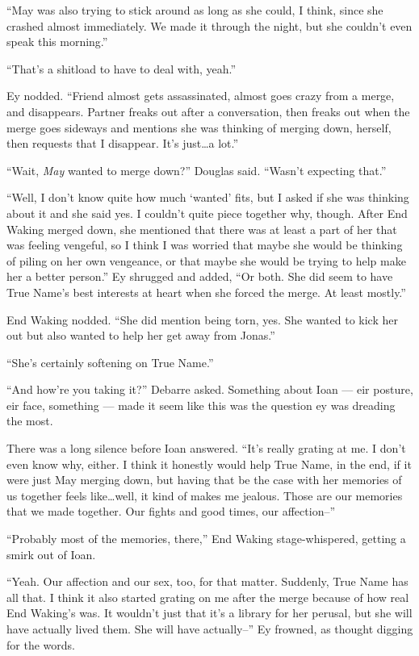 ``May was also trying to stick around as long as she could, I think, since she crashed almost immediately. We made it through the night, but she couldn't even speak this morning.''

``That's a shitload to have to deal with, yeah.''

Ey nodded. ``Friend almost gets assassinated, almost goes crazy from a merge, and disappears. Partner freaks out after a conversation, then freaks out when the merge goes sideways and mentions she was thinking of merging down, herself, then requests that I disappear. It's just\ldots a lot.''

``Wait, \emph{May} wanted to merge down?'' Douglas said. ``Wasn't expecting that.''

``Well, I don't know quite how much `wanted' fits, but I asked if she was thinking about it and she said yes. I couldn't quite piece together why, though. After End Waking merged down, she mentioned that there was at least a part of her that was feeling vengeful, so I think I was worried that maybe she would be thinking of piling on her own vengeance, or that maybe she would be trying to help make her a better person.'' Ey shrugged and added, ``Or both. She did seem to have True Name's best interests at heart when she forced the merge. At least mostly.''

End Waking nodded. ``She did mention being torn, yes. She wanted to kick her out but also wanted to help her get away from Jonas.''

``She's certainly softening on True Name.''

``And how're you taking it?'' Debarre asked. Something about Ioan — eir posture, eir face, something — made it seem like this was the question ey was dreading the most.

There was a long silence before Ioan answered. ``It's really grating at me. I don't even know why, either. I think it honestly would help True Name, in the end, if it were just May merging down, but having that be the case with her memories of us together feels like\ldots well, it kind of makes me jealous. Those are our memories that we made together. Our fights and good times, our affection--''

``Probably most of the memories, there,'' End Waking stage-whispered, getting a smirk out of Ioan.

``Yeah. Our affection and our sex, too, for that matter. Suddenly, True Name has all that. I think it also started grating on me after the merge because of how real End Waking's was. It wouldn't just that it's a library for her perusal, but she will have actually lived them. She will have actually--'' Ey frowned, as thought digging for the words.

